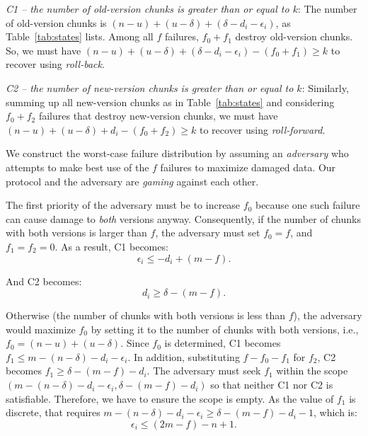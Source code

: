 \emph{C1 -- the number of old-version chunks is greater than or equal to $k$}: The number of old-version chunks is $(n -
u) + (u - \delta) + (\delta - d_i - \epsilon_i)$, as Table~\ref{tab:states}
lists. Among all $f$ failures, $f_0 + f_1$ destroy old-version chunks.
So, we must have $(n - u) + (u - \delta) + (\delta -
d_i - \epsilon_i) - (f_0 + f_1) \ge k$ to recover using \emph{roll-back}.

\emph{C2 -- the number of new-version chunks is greater than or equal to $k$}: Similarly, summing up all new-version
chunks as in Table~\ref{tab:states} and considering $f_0 + f_2$ failures that
destroy new-version chunks, we must have $(n - u) + (u - \delta) + d_i
- (f_0 + f_2) \ge k$ to recover using \emph{roll-forward}.

We construct the worst-case failure distribution by assuming an
\emph{adversary} who attempts to make best use of the $f$
failures to maximize damaged data.  Our protocol and the adversary are
\emph{gaming} against each other.

The first priority of the adversary must be to increase $f_0$ because one such
failure can cause damage to \emph{both} versions anyway.  Consequently, if the
number of chunks with both versions is larger than $f$, the adversary must set
$f_0 = f$, and $f_1 = f_2 = 0$. As a result, C1 becomes:
\begin{equation}
\epsilon_i \le -d_i + (m - f).
\label{eq:roll-back-constraint}
\end{equation}

And C2 becomes:
\begin{equation}
d_i \ge \delta - (m - f).
\label{eq:roll-forward-constraint}
\end{equation}

Otherwise (the number of chunks with both versions is less than
$f$), the adversary would maximize $f_0$ by setting it to the number
of chunks with both versions, i.e., $f_0 = (n - u) + (u - \delta)$.
Since $f_0$ is determined, C1 becomes $f_1 \le
m - (n - \delta) - d_i - \epsilon_i$. In addition, substituting $f - f_0 - f_1$
for $f_2$, C2 becomes $f_1 \ge \delta - (m - f) - d_i$.
The adversary must seek $f_1$ within the scope $(m - (n - \delta) - d_i -
\epsilon_i, \delta - (m - f) - d_i)$ so that neither C1 nor C2 is satisfiable.
Therefore, we have to ensure the scope is empty.  As the value of $f_1$ is
discrete, that requires $m - (n - \delta) - d_i - \epsilon_i \ge \delta - (m -
f) - d_i - 1$, which is:
\begin{equation}
\epsilon_i \le (2m - f) - n + 1.
\label{eq:discretionary}
\end{equation}


